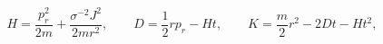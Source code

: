 \begin{equation}
H=\frac{p_r^2}{2m}+\frac{\sigma^{-2}J^2}{2mr^2},\qquad
D=\frac{1}{2}rp_r-Ht,\qquad
K=\frac{m}{2}r^2-2Dt-Ht^2,
\label{confcone}
\end{equation}

